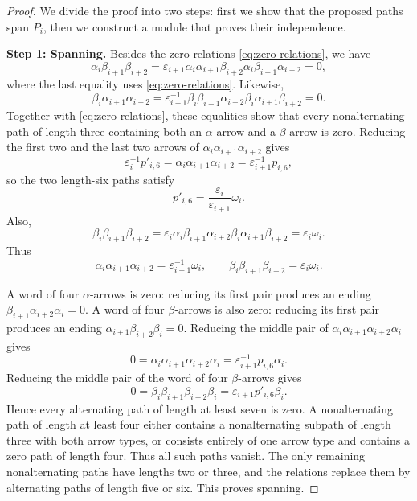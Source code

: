 \documentclass[a4paper,reqno,10pt]{amsart}
\theoremstyle{definition}
\numberwithin{equation}{section}
\begin{document}
\begin{proof}
We divide the proof into two steps: first we show that the proposed paths
span $P_i$, then we construct a module that proves their independence.

\medskip
\noindent\textbf{Step 1: Spanning.}
Besides the zero relations \eqref{eq:zero-relations}, we have
\begin{equation}
 \alpha_i\beta_{i+1}\beta_{i+2}
 =\varepsilon_{i+1}\alpha_i\alpha_{i+1}\beta_{i+2}
   \alpha_i\beta_{i+1}\alpha_{i+2}=0,
 \label{eq:additional-zero}
\end{equation}
where the last equality uses \eqref{eq:zero-relations}. Likewise,
\[
 \beta_i\alpha_{i+1}\alpha_{i+2}
 =\varepsilon_{i+1}^{-1}\beta_i\beta_{i+1}\alpha_{i+2}
   \beta_i\alpha_{i+1}\beta_{i+2}=0.
\]
Together with \eqref{eq:zero-relations}, these equalities show that every
nonalternating path of length three containing both an $\alpha$-arrow and
a $\beta$-arrow is zero. Reducing the first two and the last two arrows of
$\alpha_i\alpha_{i+1}\alpha_{i+2}$ gives
\[
 \varepsilon_i^{-1}p'_{i,6}
 =\alpha_i\alpha_{i+1}\alpha_{i+2}
 =\varepsilon_{i+1}^{-1}p_{i,6},
\]
so the two length-six paths satisfy
\begin{equation}
 p'_{i,6}=\frac{\varepsilon_i}{\varepsilon_{i+1}}\omega_i.
 \label{eq:socle-paths}
\end{equation}
Also,
\[
 \beta_i\beta_{i+1}\beta_{i+2}
 =\varepsilon_i\alpha_i\beta_{i+1}\alpha_{i+2}
   \beta_i\alpha_{i+1}\beta_{i+2}=\varepsilon_i\omega_i.
\]
Thus
\begin{equation}
 \alpha_i\alpha_{i+1}\alpha_{i+2}
 =\varepsilon_{i+1}^{-1}\omega_i,
 \qquad
 \beta_i\beta_{i+1}\beta_{i+2}=\varepsilon_i\omega_i.
 \label{eq:triple-paths}
\end{equation}

A word of four $\alpha$-arrows is zero: reducing its first pair produces
an ending $\beta_{i+1}\alpha_{i+2}\alpha_i=0$. A word of four
$\beta$-arrows is also zero: reducing its first pair produces an ending
$\alpha_{i+1}\beta_{i+2}\beta_i=0$. Reducing the middle pair of
$\alpha_i\alpha_{i+1}\alpha_{i+2}\alpha_i$ gives
\[
 0=\alpha_i\alpha_{i+1}\alpha_{i+2}\alpha_i
   =\varepsilon_{i+1}^{-1}p_{i,6}\alpha_i.
\]
Reducing the middle pair of the word of four $\beta$-arrows gives
\[
 0=\beta_i\beta_{i+1}\beta_{i+2}\beta_i
   =\varepsilon_{i+1}p'_{i,6}\beta_i.
\]
Hence every alternating path of length at least seven is zero. A nonalternating
path of length at least four either contains
a nonalternating subpath of length three with both arrow types, or consists
entirely of one arrow type and contains a zero path of length four. Thus all such paths vanish. The only remaining
nonalternating paths have lengths two or three, and the relations replace
them by alternating paths of length five or six. This proves spanning.


\end{proof}
\end{document}
